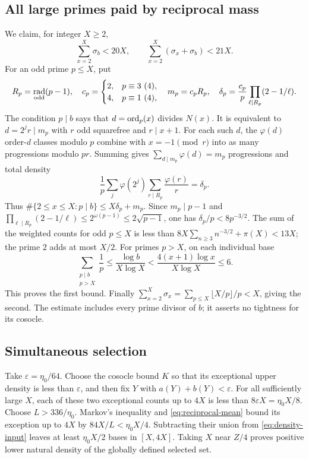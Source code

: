 \documentclass[11pt,a4paper]{article}
\theoremstyle{definition}\newtheorem{question}[theorem]{Question}
\theoremstyle{remark}\newtheorem{remark}[theorem]{Remark}
\DeclareMathOperator{\rad}{rad}\DeclareMathOperator{\supp}{supp}
\begin{document}
\subsection{All large primes paid by reciprocal mass}
We claim, for integer $X\ge2$,
\begin{equation}\label{eq:reciprocal-mean}
 \sum_{x=2}^X\sigma_b<20X,\qquad
 \sum_{x=2}^X(\sigma_x+\sigma_b)<21X.
\end{equation}
For an odd prime $p\le X$, put
\[
 R_p=\rad_{\rm odd}(p-1),\quad
 c_p=\begin{cases}2,&p\equiv3\ (4),\\4,&p\equiv1\ (4),\end{cases}
 \quad m_p=c_pR_p,\quad
 \delta_p=\frac{c_p}{p}\prod_{\ell\mid R_p}(2-1/\ell).
\]
The condition $p\mid b$ says that $d=\operatorname{ord}_p(x)$ divides $N(x)$.
It is equivalent to $d=2^j r\mid m_p$ with $r$ odd squarefree and
$r\mid x+1$. For each such $d$, the $\varphi(d)$ order-$d$ classes
modulo $p$ combine with $x=-1\pmod r$ into as many progressions
modulo $pr$. Summing gives $\sum_{d\mid m_p}\varphi(d)=m_p$
progressions and total density
\[
 \frac1p\sum_j\varphi(2^j)\sum_{r\mid R_p}\frac{\varphi(r)}r
   =\delta_p.
\]
Thus $\#\{2\le x\le X:p\mid b\}\le X\delta_p+m_p$.
Since $m_p\mid p-1$ and
$\prod_{\ell\mid R_p}(2-1/\ell)\le2^{\omega(p-1)}
\le2\sqrt{p-1}$, one has $\delta_p/p<8p^{-3/2}$.
The sum of the weighted counts for odd $p\le X$ is less than
$8X\sum_{n\ge3}n^{-3/2}+\pi(X)<13X$; the prime $2$ adds at most
$X/2$. For primes $p>X$, on each individual base
\[
 \sum_{\substack{p\mid b\\p>X}}\frac1p
 \le\frac{\log b}{X\log X}
 <\frac{4(x+1)\log x}{X\log X}\le6.
\]
This proves the first bound. Finally
$\sum_{x=2}^X\sigma_x=\sum_{p\le X}\lfloor X/p\rfloor/p<X$,
giving the second. The estimate includes every prime divisor of $b$;
it asserts no tightness for its cosocle.

\subsection{Simultaneous selection}
Take $\varepsilon=\eta_0/64$. Choose the cosocle bound $K$ so that
its exceptional upper density is less than $\varepsilon$, and then
fix $Y$ with $a(Y)+b(Y)<\varepsilon$.
For all sufficiently large $X$, each of these two exceptional counts
up to $4X$ is less than $8\varepsilon X=\eta_0X/8$.
Choose $L>336/\eta_0$. Markov's inequality and
\eqref{eq:reciprocal-mean} bound its exception up to $4X$ by
$84X/L<\eta_0X/4$. Subtracting their union from
\eqref{eq:density-input} leaves at least $\eta_0X/2$ bases in
$[X,4X]$. Taking $X$ near $Z/4$ proves positive lower natural
density of the globally defined selected set.
\end{document}
